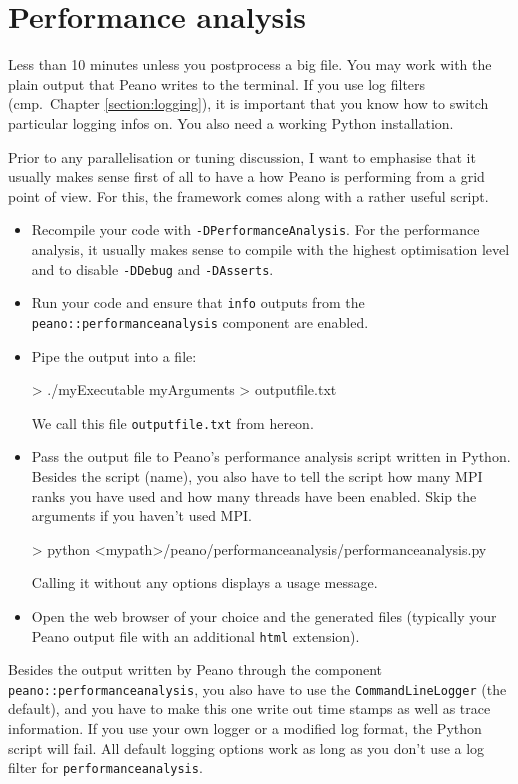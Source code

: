 \section{Performance analysis}
\label{section:performance-analysis}

\chapterDescription
  {
    Less than 10 minutes unless you postprocess a big file.
  }
  {
    You may work with the plain output that Peano writes to the terminal. If you
    use log filters (cmp.~Chapter \ref{section:logging}), it is important that
    you know how to switch particular logging infos on. You also need a working
    Python installation.
  }

\noindent
Prior to any parallelisation or tuning discussion, I want to emphasise that it
usually makes sense first of all to have a how Peano is performing from a grid
point of view. For this, the framework comes along with a rather useful script.

\begin{itemize}
  \item Recompile your code with \texttt{-DPerformanceAnalysis}. For the
    performance analysis, it usually makes sense to compile with the highest
    optimisation level and to disable \texttt{-DDebug} and \texttt{-DAsserts}.
  \item Run your code and ensure that \texttt{info} outputs from the
    \texttt{peano::performanceanalysis} component are enabled.
  \item Pipe the output into a file:
    \begin{code}
> ./myExecutable myArguments > outputfile.txt
    \end{code} 
    We call this file \texttt{outputfile.txt} from hereon.
  \item Pass the output file to Peano's performance analysis script written in
  Python. Besides the script (name), you also have to tell the script how many 
    MPI ranks you have used and how many threads have been enabled. Skip
    the arguments if you haven't used MPI.
    \begin{code}
> python <mypath>/peano/performanceanalysis/performanceanalysis.py 
    \end{code} 
    Calling it without any options displays a usage message.
  \item Open the web browser of your choice and the generated files (typically
  your Peano output file with an additional \texttt{html} extension).
\end{itemize}

\begin{remark}
Besides the output written by Peano through the component
\texttt{peano::performanceanalysis}, you also have to use the
\texttt{CommandLineLogger} (the default), and you have to make this one write
out time stamps as well as trace information. If you use your own logger or a
modified log format, the Python script will fail.
All default logging options work as long as you don't use a log filter for
\texttt{performanceanalysis}.
\end{remark}

